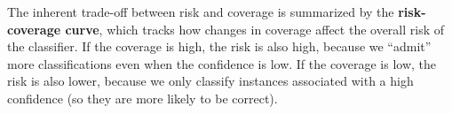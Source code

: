 The inherent trade-off between risk and coverage is summarized by the \textbf{risk-coverage curve}, which tracks how changes in coverage affect the overall risk of the classifier. If the coverage is high, the risk is also high, because we ``admit'' more classifications even when the confidence is low. If the coverage is low, the risk is also lower, because we only classify instances associated with a high confidence (so they are more likely to be correct).